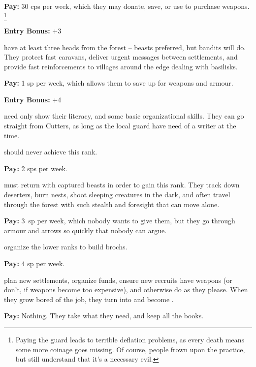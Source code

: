 \begin{multicols}{2}
\begin{description}
  \textbf{Pay:} 30 \glspl{cp} per week, which they may donate, save, or use to purchase weapons.%
  \footnote{Paying the \gls{guard} leads to terrible deflation problems, as every death means some more coinage goes missing.
  Of course, people frown upon the practice, but still understand that it's a necessary evil.}

  \textbf{Entry Bonus:} $+3$

  \label{ranger}
  have at least three heads from the forest -- beasts preferred, but bandits will do.
  They protect fast caravans, deliver urgent messages between settlements, and provide fast reinforcements to \glspl{village} around the \gls{edge} dealing with basilisks.

  \textbf{Pay:} 1 \gls{sp} per week, which allows them to save up for weapons and armour.

  \textbf{Entry Bonus:} $+4$

  \item[\Glspl{jotter}]
  \label{jotter}%
  need only show their literacy, and some basic organizational skills.
  They can go straight from Cutters, as long as the local \gls{guard} have need of a writer at the time.

   should never achieve this rank.

  \textbf{Pay:} 2 \glspl{sp} per week.

  \label{thanes}
  must return with captured beasts in order to gain this rank.
  They track down deserters, burn nests, shoot sleeping creatures in the dark, and often travel through the forest with such stealth and foresight that can move alone.
  
  \textbf{Pay:} 3~\gls{sp} per week, which nobody wants to give them, but they go through armour and arrows so quickly that nobody can argue.

  organize the lower ranks to build \glspl{broch}.

  \textbf{Pay:} 4 \gls{sp} per week.

  plan new settlements, organize funds, ensure new recruits have weapons (or don't, if weapons become too expensive), and otherwise do as they please.
  When they grow bored of the job, they turn  into  and become .

  \textbf{Pay:} Nothing.
  They take what they need, and keep all the books.

\end{description}


\end{multicols}
